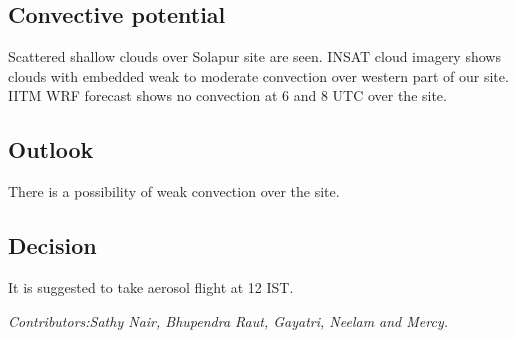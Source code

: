 \subsection*{Convective potential}
Scattered shallow clouds over Solapur site are seen. INSAT cloud imagery shows clouds with
embedded weak to moderate convection over western part of our site. IITM WRF forecast
shows no convection at 6 and 8 UTC over the site.%

\subsection*{Outlook}
There is a possibility of weak convection over the site.\\
\subsection*{Decision}
It is suggested to take aerosol flight at 12 IST.


\vfill %
\textit{Contributors:Sathy Nair, Bhupendra Raut, Gayatri, Neelam and Mercy.} 

